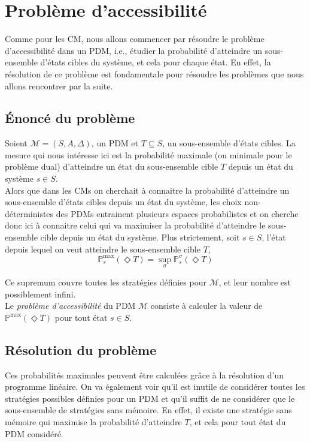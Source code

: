 \documentclass[12pt,a4paper]{report}
\theoremstyle{definition}%
\theoremstyle{remark}
\newcommand{\pr}{\mathbb{P}}
\begin{document}
\section{Problème d'accessibilité} \label{reachability-PDM}
Comme pour les CM, nous allons commencer par résoudre le problème d'accessibilité
dans un PDM, i.e., étudier la probabilité d'atteindre un sous-ensemble d'états cibles
du système, et cela pour chaque état. En effet, la résolution de ce problème est
fondamentale pour résoudre les problèmes que nous allons rencontrer par la suite.

\subsection{\'Enoncé du problème}
Soient $\mathcal{M} = (S, A, \Delta)$, un PDM et $T \subseteq S$, un sous-ensemble
d'états cibles. La mesure qui nous intéresse ici est la probabilité maximale
(ou minimale pour le problème dual) d'atteindre un état du sous-ensemble cible $T$
depuis un état du système $s \in S$. \\

Alors que dans les CMs on cherchait à connaitre la probabilité d'atteindre un
sous-ensemble d'états cibles depuis un état du système, les choix non-déterministes des PDMs entrainent
plusieurs espaces probabilistes et on cherche donc ici à connaitre celui qui va maximiser
la probabilité d'atteindre le sous-ensemble cible depuis un état du système.
Plus strictement, soit $s \in S$, l'état depuis lequel on veut atteindre le
sous-ensemble cible $T$,
\[
	\pr^{\max}_s(\Diamond T) = \sup_\sigma \pr^\sigma_s(\Diamond T)
\]

Ce supremum couvre toutes les stratégies définies pour $\mathcal{M}$, et leur nombre
est possiblement infini. \\

Le \textit{problème d'accessibilité} du PDM $\mathcal{M}$ consiste à calculer la valeur de
$\pr^{\max}(\Diamond T)$ pour tout état $s \in S$.

\subsection{Résolution du problème}
Ces probabilités maximales peuvent être calculées grâce à la résolution
d'un programme linéaire. On va également voir qu'il est inutile de considérer toutes
les stratégies possibles définies pour un PDM et qu'il suffit de ne considérer
que le sous-ensemble de stratégies sans mémoire. En effet, il existe une stratégie
sans mémoire qui maximise la probabilité d'atteindre $T$, et cela pour tout état
du PDM considéré.
\end{document}
